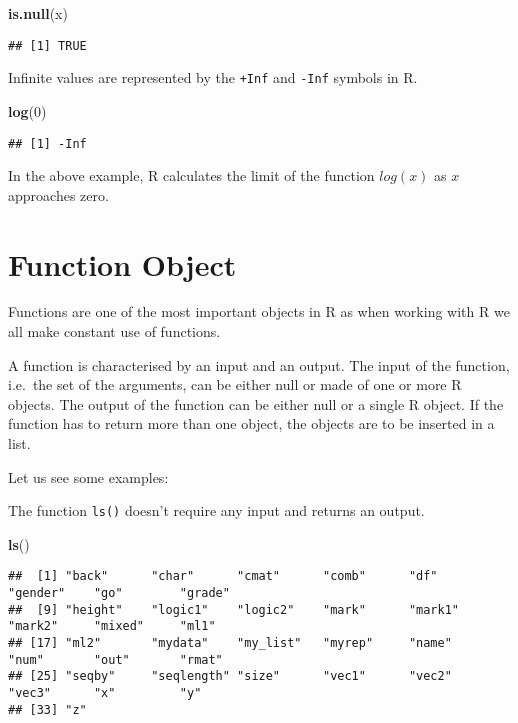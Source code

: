 \documentclass[]{book}
\newenvironment{Shaded}{\begin{snugshade}}{\end{snugshade}}
\newcommand{\KeywordTok}[1]{\textcolor[rgb]{0.13,0.29,0.53}{\textbf{{#1}}}}
\newcommand{\DecValTok}[1]{\textcolor[rgb]{0.00,0.00,0.81}{{#1}}}
\newcommand{\NormalTok}[1]{{#1}}
\begin{document}
\begin{Shaded}
\begin{Highlighting}[]
\KeywordTok{is.null}\NormalTok{(x)}
\end{Highlighting}
\end{Shaded}

\begin{verbatim}
## [1] TRUE
\end{verbatim}

Infinite values are represented by the \texttt{+Inf} and \texttt{-Inf}
symbols in R.

\begin{Shaded}
\begin{Highlighting}[]
\KeywordTok{log}\NormalTok{(}\DecValTok{0}\NormalTok{)}
\end{Highlighting}
\end{Shaded}

\begin{verbatim}
## [1] -Inf
\end{verbatim}

In the above example, R calculates the limit of the function \(log(x)\)
as \(x\) approaches zero.

\section{Function Object}\label{function-object}

Functions are one of the most important objects in R as when working
with R we all make constant use of functions.

A function is characterised by an input and an output. The input of the
function, i.e.~the set of the arguments, can be either null or made of
one or more R objects. The output of the function can be either null or
a single R object. If the function has to return more than one object,
the objects are to be inserted in a list.

Let us see some examples:

The function \texttt{ls()} doesn't require any input and returns an
output.

\begin{Shaded}
\begin{Highlighting}[]
\KeywordTok{ls}\NormalTok{()}
\end{Highlighting}
\end{Shaded}

\begin{verbatim}
##  [1] "back"      "char"      "cmat"      "comb"      "df"        "gender"    "go"        "grade"    
##  [9] "height"    "logic1"    "logic2"    "mark"      "mark1"     "mark2"     "mixed"     "ml1"      
## [17] "ml2"       "mydata"    "my_list"   "myrep"     "name"      "num"       "out"       "rmat"     
## [25] "seqby"     "seqlength" "size"      "vec1"      "vec2"      "vec3"      "x"         "y"        
## [33] "z"
\end{verbatim}
\end{document}
